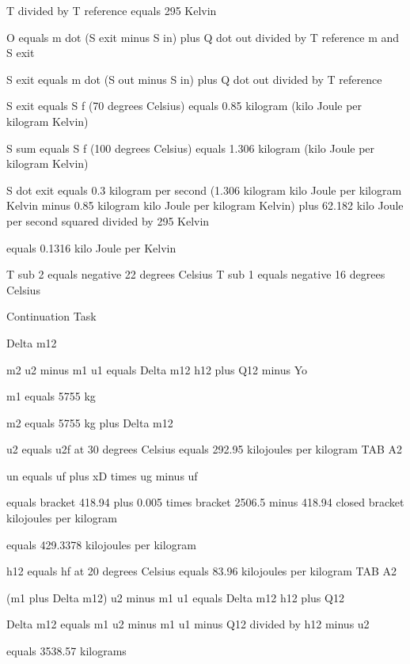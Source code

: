 T divided by T reference equals 295 Kelvin

O equals m dot (S exit minus S in) plus Q dot out divided by T reference m and S exit

S exit equals m dot (S out minus S in) plus Q dot out divided by T reference

S exit equals S f (70 degrees Celsius) equals 0.85 kilogram (kilo Joule per kilogram Kelvin)

S sum equals S f (100 degrees Celsius) equals 1.306 kilogram (kilo Joule per kilogram Kelvin)

S dot exit equals 0.3 kilogram per second (1.306 kilogram kilo Joule per kilogram Kelvin minus 0.85 kilogram kilo Joule per kilogram Kelvin) plus 62.182 kilo Joule per second squared divided by 295 Kelvin

equals 0.1316 kilo Joule per Kelvin

T sub 2 equals negative 22 degrees Celsius  
T sub 1 equals negative 16 degrees Celsius

Continuation Task

Delta m12

m2 u2 minus m1 u1 equals Delta m12 h12 plus Q12 minus Yo

m1 equals 5755 kg

m2 equals 5755 kg plus Delta m12

u2 equals u2f at 30 degrees Celsius equals 292.95 kilojoules per kilogram TAB A2

un equals uf plus xD times ug minus uf

equals bracket 418.94 plus 0.005 times bracket 2506.5 minus 418.94 closed bracket kilojoules per kilogram

equals 429.3378 kilojoules per kilogram

h12 equals hf at 20 degrees Celsius equals 83.96 kilojoules per kilogram TAB A2

(m1 plus Delta m12) u2 minus m1 u1 equals Delta m12 h12 plus Q12

Delta m12 equals m1 u2 minus m1 u1 minus Q12 divided by h12 minus u2

equals 3538.57 kilograms